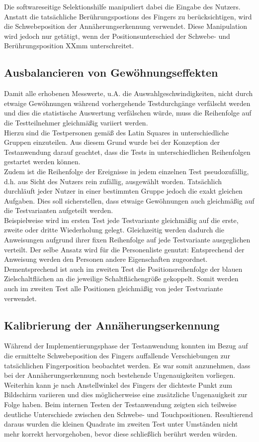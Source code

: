 \documentclass[12pt,bibliography=totocnumbered,listof=totocnumbered,abstracton]{scrreprt}
\begin{document}
Die softwareseitige Selektionshilfe manipuliert dabei die Eingabe des Nutzers. Anstatt die tatsächliche Berührungspostions des Fingers zu berücksichtigen, wird die Schwebeposition der Annäherungserkennung verwendet. Diese Manipulation wird jedoch nur getätigt, wenn der Positionsunterschied der Schwebe- und Berührungsposition XXmm unterschreitet.

\subsection{Ausbalancieren von Gewöhnungseffekten}
Damit alle erhobenen Messwerte, u.A. die Auswahlgeschwindigkeiten, nicht durch etwaige Gewöhnungen während vorhergehende Testdurchgänge verfälscht werden und dies die statistische Auswertung verfälschen würde, muss die Reihenfolge auf die Testteilnehmer gleichmäßig variiert werden.\\
Hierzu sind die Testpersonen gemäß des Latin Squares in unterschiedliche Gruppen einzuteilen. Aus diesem Grund wurde bei der Konzeption der Testanwendung darauf geachtet, dass die Tests in unterschiedlichen Reihenfolgen gestartet werden können.\\
Zudem ist die Reihenfolge der Ereignisse in jedem einzelnen Test pseudozufällig, d.h. aus Sicht des Nutzers rein zufällig, ausgewählt worden. Tatsächlich durchläuft jeder Nutzer in einer bestimmten Gruppe jedoch die exakt gleichen Aufgaben. Dies soll sicherstellen, dass etwaige Gewöhnungen auch gleichmäßig auf die Testvarianten aufgeteilt werden.\\
Beispielweise wird im ersten Test jede Testvariante gleichmäßig auf die erste, zweite oder dritte Wiederholung gelegt. Gleichzeitig werden dadurch die Anweisungen aufgrund ihrer fixen Reihenfolge auf jede Testvariante ausgeglichen verteilt. Der selbe Ansatz wird für die Personenliste genutzt: Entsprechend der Anweisung werden den Personen andere Eigenschaften zugeordnet. Dementsprechend ist auch im zweiten Test die Positionsreihenfolge der blauen Zielschaltflächen an die jeweilige Schaltflächengröße gekoppelt. Somit werden auch im zweiten Test alle Positionen gleichmäßig von jeder Testvariante verwendet.

\subsection{Kalibrierung der Annäherungserkennung}
Während der Implementierungsphase der Testanwendung konnten im Bezug auf die ermittelte Schwebeposition des Fingers auffallende  Verschiebungen zur tatsächlichen Fingerposition beobachtet werden. Es war somit anzunehmen, dass bei der Annäherungserkennung noch bestehende Ungenauigkeiten vorliegen. Weiterhin kann je nach Anstellwinkel des Fingers der dichteste Punkt zum Bildschirm variieren und dies möglicherweise eine zusätzliche Ungenauigkeit zur Folge haben. Beim internen Testen der Testanwendung zeigten sich teilweise deutliche Unterschiede zwischen den Schwebe- und Touchpositionen. Resultierend daraus wurden die kleinen Quadrate im zweiten Test unter Umständen nicht mehr korrekt hervorgehoben, bevor diese schließlich berührt werden würden.
\end{document}
